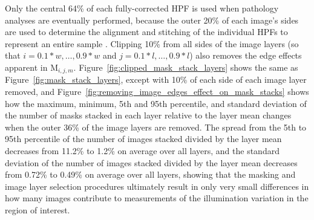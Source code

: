 \documentclass[letterpaper,11pt]{article}
\newcommand{\reffig}[1]{Figure~\ref{#1}}
\newcommand{\Mu}{\mathrm{M}}
\begin{document}
Only the central 64\% of each fully-corrected HPF is used when pathology analyses are eventually performed, because the outer 20\% of each image's sides are used to determine the alignment and stitching of the individual HPFs to represent an entire sample \cite{Heshy}. Clipping 10\% from all sides of the image layers (so that $i=0.1*w,\ldots,0.9*w$ and $j=0.1*l,\ldots,0.9*l$) also removes the edge effects apparent in $\Mu_{i,j,m}$. \reffig{fig:clipped_mask_stack_layers} shows the same as \reffig{fig:mask_stack_layers}, except with 10\% of each side of each image layer removed, and \reffig{fig:removing_image_edges_effect_on_mask_stacks} shows how the maximum, minimum, 5th and 95th percentile, and standard deviation of the number of masks stacked in each layer relative to the layer mean changes when the outer 36\% of the image layers are removed. The spread from the 5th to 95th percentile of the number of images stacked divided by the layer mean decreases from 11.2\% to 1.2\% on average over all layers, and the standard deviation of the number of images stacked divided by the layer mean decreases from 0.72\% to 0.49\% on average over all layers, showing that the masking and image layer selection procedures ultimately result in only very small differences in how many images contribute to measurements of the illumination variation in the region of interest.
\end{document}
